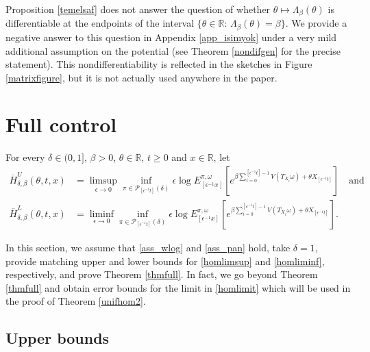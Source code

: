 \documentclass[a4paper]{amsart}
\numberwithin{equation}{section}
\theoremstyle{plain}
\theoremstyle{remark}
\begin{document}
	Proposition \ref{temelsaf} does not answer the question of whether $\theta\mapsto\Lambda_\beta(\theta)$ is differentiable at the endpoints of the interval $\{\theta\in\mathbb{R}:\,\Lambda_\beta(\theta) = \beta\}$. We provide a negative answer to this question in Appendix \ref{app_isimyok} under a very mild additional assumption on the potential (see Theorem \ref{nondifgen} for the precise statement). This nondifferentiability is reflected in the sketches in Figure \ref{matrixfigure}, but it is not actually used anywhere in the paper.

\section{Full control}\label{ayirmayir}

For every $\delta\in(0,1]$, $\beta>0$, $\theta\in\mathbb{R}$, $t\ge0$ and $x\in\mathbb{R}$, let 
\begin{align}
\overline H_{\delta,\beta}^U(\theta,t,x) &= \limsup_{{\epsilon}\to0}\inf_{\pi\in\mathcal{P}_{[{\epsilon^{-1}} t]}(\delta)}{\epsilon}\log E_{[{\epsilon^{-1}} x]}^{\pi,\omega}\left[e^{\beta\sum_{i=0}^{[{\epsilon^{-1}} t]-1}V(T_{X_i}\omega) + \theta X_{[{\epsilon^{-1}} t]}}\right]\quad \text{and}\label{homlimsup}\\
\overline H_{\delta,\beta}^L(\theta,t,x) &= \liminf_{{\epsilon}\to0}\inf_{\pi\in\mathcal{P}_{[{\epsilon^{-1}} t]}(\delta)}{\epsilon}\log E_{[{\epsilon^{-1}} x]}^{\pi,\omega}\left[e^{\beta\sum_{i=0}^{[{\epsilon^{-1}} t]-1}V(T_{X_i}\omega) + \theta X_{[{\epsilon^{-1}} t]}}\right].\label{homliminf}
\end{align}

In this section, we assume that \eqref{ass_wlog} and \eqref{ass_pan} hold, take $\delta = 1$, provide matching upper and lower bounds for \eqref{homlimsup} and \eqref{homliminf}, respectively, and prove Theorem \ref{thmfull}. In fact, we go beyond Theorem \ref{thmfull} and obtain error bounds for the limit in \eqref{homlimit} 
which will be used in the proof of Theorem \ref{unifhom2}.

\subsection{Upper bounds}\label{apirband}
\end{document}
